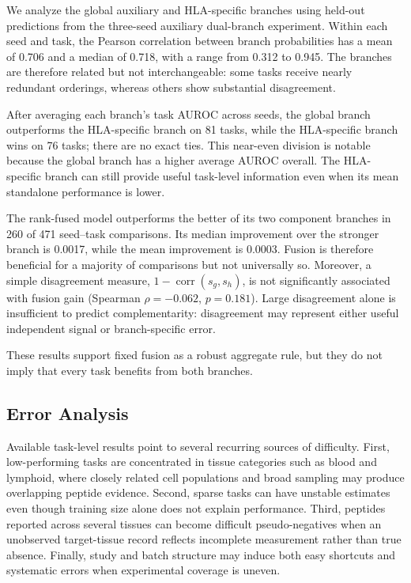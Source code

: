 We analyze the global auxiliary and HLA-specific branches using held-out predictions from the three-seed auxiliary dual-branch experiment. Within each seed and task, the Pearson correlation between branch probabilities has a mean of 0.706 and a median of 0.718, with a range from 0.312 to 0.945. The branches are therefore related but not interchangeable: some tasks receive nearly redundant orderings, whereas others show substantial disagreement.

After averaging each branch's task AUROC across seeds, the global branch outperforms the HLA-specific branch on 81 tasks, while the HLA-specific branch wins on 76 tasks; there are no exact ties. This near-even division is notable because the global branch has a higher average AUROC overall. The HLA-specific branch can still provide useful task-level information even when its mean standalone performance is lower.

The rank-fused model outperforms the better of its two component branches in 260 of 471 seed--task comparisons. Its median improvement over the stronger branch is 0.0017, while the mean improvement is 0.0003. Fusion is therefore beneficial for a majority of comparisons but not universally so. Moreover, a simple disagreement measure, \(1-\operatorname{corr}(s_g,s_h)\), is not significantly associated with fusion gain (Spearman \(\rho=-0.062\), \(p=0.181\)). Large disagreement alone is insufficient to predict complementarity: disagreement may represent either useful independent signal or branch-specific error.

These results support fixed fusion as a robust aggregate rule, but they do not imply that every task benefits from both branches.

\subsection{Error Analysis}

Available task-level results point to several recurring sources of difficulty. First, low-performing tasks are concentrated in tissue categories such as blood and lymphoid, where closely related cell populations and broad sampling may produce overlapping peptide evidence. Second, sparse tasks can have unstable estimates even though training size alone does not explain performance. Third, peptides reported across several tissues can become difficult pseudo-negatives when an unobserved target-tissue record reflects incomplete measurement rather than true absence. Finally, study and batch structure may induce both easy shortcuts and systematic errors when experimental coverage is uneven.
